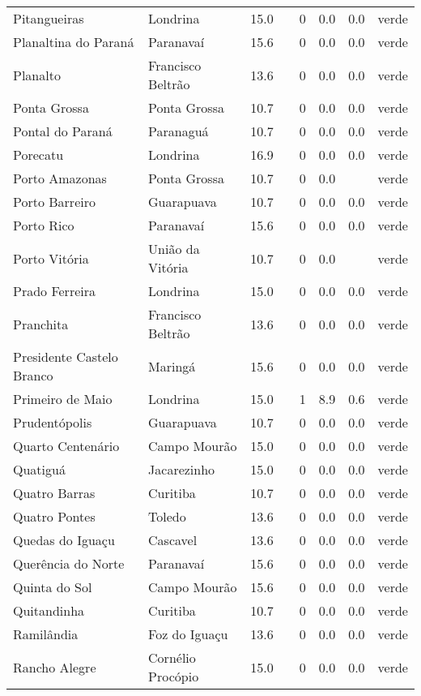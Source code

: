 \begin{longtable}{l|lllllll}
  Pitangueiras & Londrina & 15.0 &  & 0 & 0.0 & 0.0 & verde \\ 
  Planaltina do Paraná & Paranavaí & 15.6 &  & 0 & 0.0 & 0.0 & verde \\ 
  Planalto & Francisco Beltrão & 13.6 &  & 0 & 0.0 & 0.0 & verde \\ 
  Ponta Grossa & Ponta Grossa & 10.7 &  & 0 & 0.0 & 0.0 & verde \\ 
  Pontal do Paraná & Paranaguá & 10.7 &  & 0 & 0.0 & 0.0 & verde \\ 
  Porecatu & Londrina & 16.9 &  & 0 & 0.0 & 0.0 & verde \\ 
  Porto Amazonas & Ponta Grossa & 10.7 &  & 0 & 0.0 &  & verde \\ 
  Porto Barreiro & Guarapuava & 10.7 &  & 0 & 0.0 & 0.0 & verde \\ 
  Porto Rico & Paranavaí & 15.6 &  & 0 & 0.0 & 0.0 & verde \\ 
  Porto Vitória & União da Vitória & 10.7 &  & 0 & 0.0 &  & verde \\ 
  Prado Ferreira & Londrina & 15.0 &  & 0 & 0.0 & 0.0 & verde \\ 
  Pranchita & Francisco Beltrão & 13.6 &  & 0 & 0.0 & 0.0 & verde \\ 
  Presidente Castelo Branco & Maringá & 15.6 &  & 0 & 0.0 & 0.0 & verde \\ 
  Primeiro de Maio & Londrina & 15.0 &  & 1 & 8.9 & 0.6 & verde \\ 
  Prudentópolis & Guarapuava & 10.7 &  & 0 & 0.0 & 0.0 & verde \\ 
  Quarto Centenário & Campo Mourão & 15.0 &  & 0 & 0.0 & 0.0 & verde \\ 
  Quatiguá & Jacarezinho & 15.0 &  & 0 & 0.0 & 0.0 & verde \\ 
  Quatro Barras & Curitiba & 10.7 &  & 0 & 0.0 & 0.0 & verde \\ 
  Quatro Pontes & Toledo & 13.6 &  & 0 & 0.0 & 0.0 & verde \\ 
  Quedas do Iguaçu & Cascavel & 13.6 &  & 0 & 0.0 & 0.0 & verde \\ 
  Querência do Norte & Paranavaí & 15.6 &  & 0 & 0.0 & 0.0 & verde \\ 
  Quinta do Sol & Campo Mourão & 15.6 &  & 0 & 0.0 & 0.0 & verde \\ 
  Quitandinha & Curitiba & 10.7 &  & 0 & 0.0 & 0.0 & verde \\ 
  Ramilândia & Foz do Iguaçu & 13.6 &  & 0 & 0.0 & 0.0 & verde \\ 
  Rancho Alegre & Cornélio Procópio & 15.0 &  & 0 & 0.0 & 0.0 & verde \\ 

\end{longtable}
